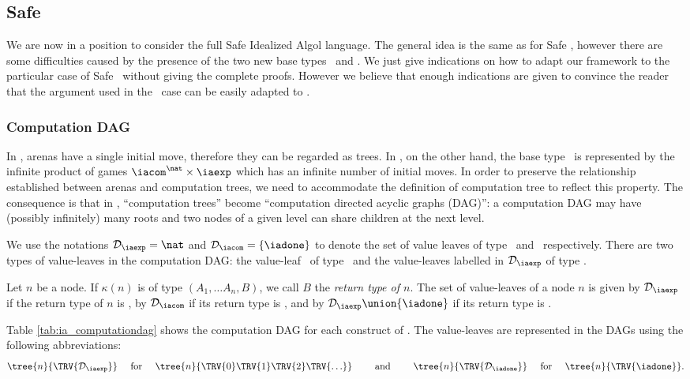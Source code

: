 \subsection{Safe \ialgol}

We are now in a position to consider the full Safe Idealized Algol
language. The general idea is the same as for Safe \pcf, however
there are some difficulties caused by the presence of the two new
base types \iavar\ and \iacom. We just give indications on how to
adapt our framework to the particular case of Safe \ialgol\ without
giving the complete proofs. However we believe that enough
indications are given to convince the reader that the argument used
in the \pcf\ case can be easily adapted to \ialgol.

\subsubsection{Computation DAG}
In \pcf, arenas have a single initial move, therefore they can be regarded as trees.
In \ialgol, on the other hand, the base type \iavar\ is represented by the infinite product of games $\iacom^{\nat} \times \iaexp$
which has an infinite number of initial moves.
In order to preserve the relationship established between arenas and computation trees, we need to accommodate the definition of
computation tree to reflect this property.
The consequence is that in \ialgol, ``computation trees'' become ``computation directed acyclic graphs (DAG)'':
a computation DAG may have (possibly infinitely) many roots and two nodes of a given level can share children at the next level.


We use the notations $\mathcal{D}_{\iaexp} = \nat$ and $\mathcal{D}_{\iacom} = \{ \iadone \}$ to denote the set
of value leaves of type \iaexp\ and \iacom\ respectively.
There are two types of value-leaves in the computation DAG:
the value-leaf \iadone\ of type \iacom\ and the value-leaves
labelled in $\mathcal{D}_{\iaexp}$ of type \iaexp.

Let $n$ be a node. If $\kappa(n)$ is of type $(A_1,\ldots A_n,B)$, we call $B$ the \emph{return type of $n$}.
The set of value-leaves of a node $n$
is given by $\mathcal{D}_{\iaexp}$ if the return type of $n$ is \iaexp,
by $\mathcal{D}_{\iacom}$ if its return type is \iacom,
and by $\mathcal{D}_{\iaexp} \union \{ \iadone \}$ if its return type is \iavar.


Table \ref{tab:ia_computationdag} shows the computation DAG for each construct of \ialgol.
The value-leaves are represented in the DAGs using the following abbreviations:
$$ \tree{n}{ \TRV{\mathcal{D}_\iaexp} }  \quad \mbox{ for }\quad
 \tree{n}{ \TRV{0} \TRV{1} \TRV{2} \TRV{\ldots} }
 \qquad \mbox{ and } \qquad
 \tree{n}{ \TRV{\mathcal{D}_\iadone} }  \quad \mbox{ for }\quad
 \tree{n}{ \TRV{\iadone }}.
$$

